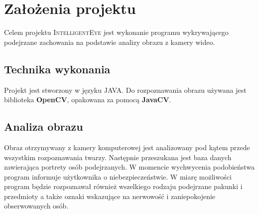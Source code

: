 \section{Założenia projektu}
Celem projektu \textsc{IntelligentEye} jest wykonanie programu wykrywającego podejrzane zachowania na podstawie analizy obrazu z kamery wideo.

\subsection{Technika wykonania}
Projekt jest stworzony w języku JAVA. Do rozpoznawania obrazu używana jest biblioteka \textbf{OpenCV}, opakowana za pomocą \textbf{JavaCV}.


\subsection{Analiza obrazu}
Obraz otrzymywany z kamery komputerowej jest analizowany pod kątem przede wszystkim rozpoznawania twarzy. Następnie przeszukana jest baza danych zawierająca portrety osób podejrzanych. W momencie wychwycenia podobieństwa program informuje użytkownika o niebezpieczeństwie. W miarę możliwości program będzie rozpoznawał również wszelkiego rodzaju podejrzane pakunki i przedmioty a także oznaki wskazujące na nerwowość i zaniepokojenie obserwowanych osób.

